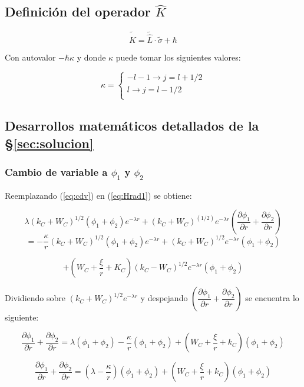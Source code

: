 \documentclass[a4paper, 12pt]{article} %
\begin{document}
\subsection{Definici\'on del operador $\hat{K}$}\label{sec:k}

\begin{equation}
\widetilde{\hat{K}} = \widetilde{\hat{L}}\cdot \widetilde{\sigma} + \hbar
\end{equation}

Con autovalor $-\hbar \kappa$ y donde $\kappa$ puede tomar los siguientes
valores:

\[ \kappa = 
\begin{cases}
-l - 1 \rightarrow j = l + 1/2  \\
l \rightarrow j = l - 1/2 \\ 
\end{cases}
\]  


\subsection{Desarrollos matem\'aticos detallados de la \S \ref{sec:solucion}}\label{sec:pasoapaso}

\subsubsection{Cambio de variable a $\phi_1$ y $\phi_2$}

Reemplazando (\ref{eq:cdv}) en (\ref{eq:Hrad1})  se obtiene:

\[
\lambda (k_C + W_C)^{1/2}(\phi_1 + \phi_2)e^{-\lambda r} + (k_C + W_C)^(1/2)e^{-\lambda r}\left( \dfrac{\partial \phi_1}{\partial r} 
+ \dfrac{\partial \phi_2}{\partial r} \right)
\]
\[
 = - \dfrac{\kappa}{r}  (k_C + W_C)^{1/2}(\phi_1 + \phi_2)e^{-\lambda r} 
+ (k_C + W_C)^{1/2}e^{-\lambda r} (\phi_1 + \phi_2)
\]

\[
+ \left ( W_C + \dfrac{\xi}{r} + K_C \right )(k_C - W_C)^{1/2}e^{-\lambda r}(\phi_1 + \phi_2)
\]


Dividiendo sobre $(k_C + W_C)^{1/2}e^{-\lambda r}$ y despejando $\left( \dfrac{\partial \phi_1}{\partial r} 
+ \dfrac{\partial \phi_2}{\partial r} \right)$ se encuentra lo siguiente:

\[
\dfrac{\partial \phi_1}{\partial r} + \dfrac{\partial \phi_2}{\partial r} = \lambda (\phi_1 + \phi_2) - \dfrac{\kappa}{r}(\phi_1 + \phi_2)
+\left( W_C + \dfrac{\xi}{r} + k_C  \right)(\phi_1 + \phi_2) 
\]

\begin{equation}
\dfrac{\partial \phi_1}{\partial r} + \dfrac{\partial \phi_2}{\partial r} = \left ( \lambda - \dfrac{\kappa}{r} \right ) (\phi_1 + \phi_2)
+\left( W_C + \dfrac{\xi}{r} + k_C  \right)(\phi_1 + \phi_2) 
\end{equation}
\end{document}
